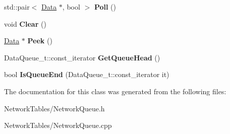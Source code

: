 \begin{DoxyCompactItemize}
\item 
\hypertarget{classNetworkTables_1_1NetworkQueue_a202ba158bee7e01aabaa655bdee6d792}{
std::pair$<$ \hyperlink{classNetworkTables_1_1Data}{Data} $\ast$, bool $>$ {\bfseries Poll} ()}
\label{classNetworkTables_1_1NetworkQueue_a202ba158bee7e01aabaa655bdee6d792}

\item 
\hypertarget{classNetworkTables_1_1NetworkQueue_a1e8d912830aaa2d8842e805ca77899e7}{
void {\bfseries Clear} ()}
\label{classNetworkTables_1_1NetworkQueue_a1e8d912830aaa2d8842e805ca77899e7}

\item 
\hypertarget{classNetworkTables_1_1NetworkQueue_ac224a9dbbeaf5eff29b5e99ee6006f0c}{
\hyperlink{classNetworkTables_1_1Data}{Data} $\ast$ {\bfseries Peek} ()}
\label{classNetworkTables_1_1NetworkQueue_ac224a9dbbeaf5eff29b5e99ee6006f0c}

\item 
\hypertarget{classNetworkTables_1_1NetworkQueue_a410cbaa7ce3a70cc15c7d36362d41ad5}{
DataQueue\_\-t::const\_\-iterator {\bfseries GetQueueHead} ()}
\label{classNetworkTables_1_1NetworkQueue_a410cbaa7ce3a70cc15c7d36362d41ad5}

\item 
\hypertarget{classNetworkTables_1_1NetworkQueue_a23bf65087c78a21ba64fc9ee25a4d012}{
bool {\bfseries IsQueueEnd} (DataQueue\_\-t::const\_\-iterator it)}
\label{classNetworkTables_1_1NetworkQueue_a23bf65087c78a21ba64fc9ee25a4d012}

\end{DoxyCompactItemize}


The documentation for this class was generated from the following files:\begin{DoxyCompactItemize}
\item 
NetworkTables/NetworkQueue.h\item 
NetworkTables/NetworkQueue.cpp\end{DoxyCompactItemize}
